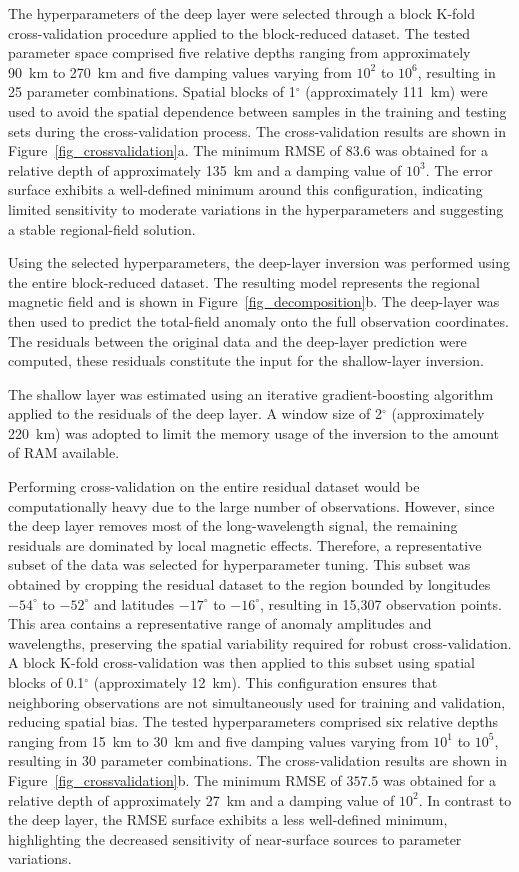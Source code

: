 The hyperparameters of the deep layer were selected through a block K-fold
cross-validation procedure applied to the block-reduced dataset. The tested
parameter space comprised five relative depths ranging from approximately
90~km to 270~km and five damping values varying from $10^{2}$ to $10^{6}$,
resulting in 25 parameter combinations. Spatial blocks of 1$^{\circ}$ 
(approximately 111~km) were used to avoid the spatial dependence between samples
in the training and testing sets during the cross-validation process.
The cross-validation results are shown in
Figure~\ref{fig_crossvalidation}a. The minimum RMSE of $83.6$ was obtained for a relative
depth of approximately 135~km and a damping value of $10^{3}$. The error
surface exhibits a well-defined minimum around this configuration,
indicating limited sensitivity to moderate variations in the
hyperparameters and suggesting a stable regional-field solution.

Using the selected hyperparameters, the deep-layer inversion was performed
using the entire block-reduced dataset. The resulting model represents the
regional magnetic field and is shown in
Figure~\ref{fig_decomposition}b. The deep-layer was then used to predict the
total-field anomaly onto the full observation coordinates.
The residuals between the original data and the deep-layer prediction were
computed, these residuals constitute the input for the shallow-layer inversion.

The shallow layer was estimated using an iterative gradient-boosting
algorithm applied to the residuals of the deep layer. A window size of
2$^{\circ}$ (approximately 220~km) was adopted to limit the memory usage of the
inversion to the amount of RAM available.

Performing cross-validation on the entire residual dataset would be
computationally heavy due to the large number of observations.
However, since
the deep layer removes most of the long-wavelength signal, the remaining
residuals are dominated by local magnetic effects. Therefore, a
representative subset of the data was selected for hyperparameter tuning.
This subset was obtained by cropping the residual dataset to the region
bounded by longitudes $-54^{\circ}$ to $-52^{\circ}$ and latitudes
$-17^{\circ}$ to $-16^{\circ}$, resulting in 15,307 observation points. This
area contains a representative range of anomaly amplitudes and wavelengths,
preserving the spatial variability required for robust cross-validation.
A block K-fold cross-validation was then applied to this subset using spatial
blocks of 0.1$^\circ$ (approximately 12~km). This configuration ensures that neighboring
observations are not simultaneously used for training and validation,
reducing spatial bias. The tested hyperparameters comprised six relative
depths ranging from 15~km to 30~km and five damping values varying from $10^{1}$
to $10^{5}$, resulting in 30 parameter combinations.
The cross-validation results are shown in
Figure~\ref{fig_crossvalidation}b. The minimum RMSE of $357.5$ was obtained for a relative
depth of approximately 27~km and a damping value of $10^{2}$. In contrast to
the deep layer, the RMSE surface exhibits a less well-defined minimum,
highlighting the decreased sensitivity of near-surface sources to parameter
variations.

